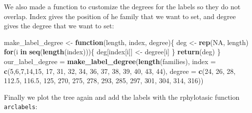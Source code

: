 \documentclass[]{article}
\newenvironment{Shaded}{\begin{snugshade}}{\end{snugshade}}
\newcommand{\ControlFlowTok}[1]{\textcolor[rgb]{0.13,0.29,0.53}{\textbf{#1}}}
\newcommand{\DataTypeTok}[1]{\textcolor[rgb]{0.13,0.29,0.53}{#1}}
\newcommand{\DecValTok}[1]{\textcolor[rgb]{0.00,0.00,0.81}{#1}}
\newcommand{\FloatTok}[1]{\textcolor[rgb]{0.00,0.00,0.81}{#1}}
\newcommand{\KeywordTok}[1]{\textcolor[rgb]{0.13,0.29,0.53}{\textbf{#1}}}
\newcommand{\NormalTok}[1]{#1}
\newcommand{\OtherTok}[1]{\textcolor[rgb]{0.56,0.35,0.01}{#1}}
\newcommand{\StringTok}[1]{\textcolor[rgb]{0.31,0.60,0.02}{#1}}
\begin{document}
We also made a function to customize the degrees for the labels so they do not overlap. Index gives the position of he family that we want to set, and degree gives the degree that we want to set:

\begin{Shaded}
\begin{Highlighting}[]
\NormalTok{make_label_degree <-}\StringTok{ }\ControlFlowTok{function}\NormalTok{(length, index, degree)\{}
\NormalTok{  deg <-}\StringTok{ }\KeywordTok{rep}\NormalTok{(}\OtherTok{NA}\NormalTok{, length)}
  \ControlFlowTok{for}\NormalTok{(i }\ControlFlowTok{in} \KeywordTok{seq}\NormalTok{(}\KeywordTok{length}\NormalTok{(index)))\{}
\NormalTok{    deg[index[i]] <-}\StringTok{ }\NormalTok{degree[i]}
\NormalTok{  \}}
  \KeywordTok{return}\NormalTok{(deg)}
\NormalTok{\}}
\NormalTok{our_label_degree =}\StringTok{ }\KeywordTok{make_label_degree}\NormalTok{(}\KeywordTok{length}\NormalTok{(families),}
  \DataTypeTok{index =} \KeywordTok{c}\NormalTok{(}\DecValTok{5}\NormalTok{,}\DecValTok{6}\NormalTok{,}\DecValTok{7}\NormalTok{,}\DecValTok{14}\NormalTok{,}\DecValTok{15}\NormalTok{, }\DecValTok{17}\NormalTok{, }\DecValTok{31}\NormalTok{, }\DecValTok{32}\NormalTok{, }\DecValTok{34}\NormalTok{, }\DecValTok{36}\NormalTok{, }\DecValTok{37}\NormalTok{, }\DecValTok{38}\NormalTok{, }\DecValTok{39}\NormalTok{, }\DecValTok{40}\NormalTok{, }\DecValTok{43}\NormalTok{, }\DecValTok{44}\NormalTok{),}
  \DataTypeTok{degree =} \KeywordTok{c}\NormalTok{(}\DecValTok{24}\NormalTok{, }\DecValTok{26}\NormalTok{, }\DecValTok{28}\NormalTok{, }\FloatTok{112.5}\NormalTok{, }\FloatTok{116.5}\NormalTok{, }\DecValTok{125}\NormalTok{, }\DecValTok{270}\NormalTok{, }\DecValTok{275}\NormalTok{, }\DecValTok{278}\NormalTok{, }\DecValTok{293}\NormalTok{, }\DecValTok{285}\NormalTok{, }\DecValTok{297}\NormalTok{, }\DecValTok{301}\NormalTok{, }\DecValTok{304}\NormalTok{, }\DecValTok{314}\NormalTok{, }\DecValTok{316}\NormalTok{))}
\end{Highlighting}
\end{Shaded}

Finally we plot the tree again and add the labels with the rphylotasic function \texttt{arclabels}:
\end{document}
